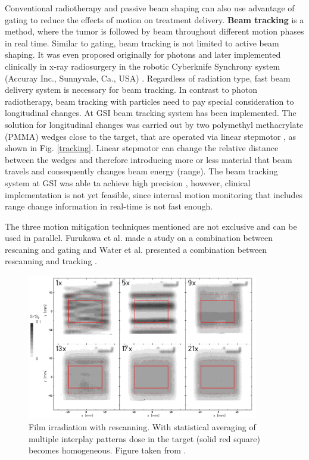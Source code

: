 \documentclass[type=dr, dr=rernat, accentcolor=tud7b,colorbacktitle, bigchapter, openright, twoside, 12pt ]{tudthesis}
\begin{document}
Conventional radiotherapy and passive beam shaping can also use advantage of gating to reduce the effects of motion on treatment delivery.
\newline
\textbf{Beam tracking} is a method, where the tumor is followed by beam throughout different motion phases in real time. Similar to gating, beam tracking is not limited to active beam shaping. It was even proposed originally 
for photons \cite{Keall2001} and later implemented clinically in x-ray radiosurgery in the robotic Cyberknife Synchrony system (Accuray Inc., Sunnyvale, Ca., USA) \cite{Brown2007a,Kilby2010}. Regardless of radiation type, 
fast beam delivery system is necessary for beam tracking. In contrast to photon radiotherapy, beam tracking with particles need to pay special consideration to longitudinal changes. At GSI beam tracking system has been implemented.
The solution for longitudinal changes was carried out by two polymethyl methacrylate (PMMA) wedges close to the target, that are operated via linear stepmotor \cite{Saito2009}, as shown in Fig. \ref{tracking}. Linear stepmotor can
change the relative distance between the wedges and therefore introducing more or less material that beam travels and consequently changes beam energy (range). The beam tracking system at GSI was able ta achieve high precision \cite{Bert2007, Bert2009, Saito2009},
however, clinical implementation is not yet feasible, since internal motion monitoring that includes range change information in real-time is not fast enough.


The three motion mitigation techniques mentioned are not exclusive and can be used in parallel. Furukawa et al. made a study on a combination between rescaning and gating \cite{Furukawa2007} and Water et al. presented a combination
between rescanning and tracking \cite{Water2009}.
\begin{figure}[H]
\begin{center}
\includegraphics[width=0.9\textwidth]{./Images/rescanning.png}
\caption{Film irradiation with rescanning. With statistical averaging of multiple interplay patterns dose in the target (solid red square) becomes homogeneous. Figure taken from \cite{Bert09}.}
\label{rescanning}
\end{center}
\end{figure}
\end{document}
